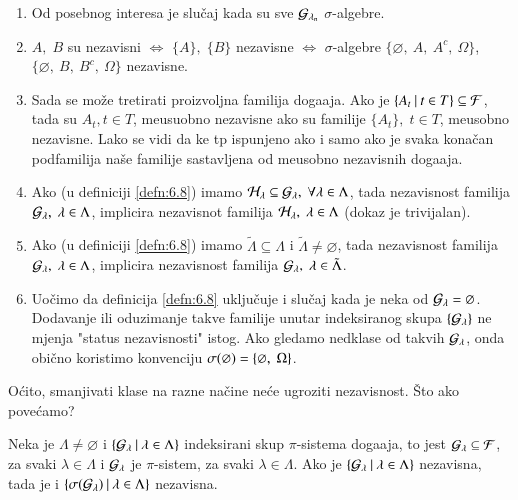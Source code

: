 \begin{nap} \label{nap:6.9}
    \begin{enumerate}[label=(\alph*)]
        \item Od posebnog interesa je slu\v caj kada su sve $\mathcal{G}_{\lambda_n}$ $\sigma$-algebre.
        \item $A, \; B$ su nezavisni $\iff$ $\{A\}, \; \{B\}$ nezavisne $\iff$ $\sigma$-algebre $\{ \varnothing, \: A, \: A^c, \: \Omega \}$, $\{ \varnothing, \: B, \: B^c, \: \Omega \}$ nezavisne.
        \item   \label{nap:6.9c}
        Sada se mo\v ze tretirati proizvoljna familija doga\dj aja.
        Ako je $\{{A_t} \: | \: {t \in T}\} \subseteq \mathcal{F}$, tada su $A_t, t \in T$, me\dj usuobno nezavisne ako su familije $\{A_t\}, \; t \in T$, me\dj usobno nezavisne.
        Lako se vidi da ke tp ispunjeno ako i samo ako je svaka kona\v can podfamilija na\v se familije sastavljena od me\dj usobno nezavisnih doga\dj aja.
        \item \label{nap:6.9d}
        Ako (u definiciji \ref{defn:6.8}) imamo $\mathcal{H}_\lambda \subseteq \mathcal{G}_\lambda, \; \forall \lambda \in \Lambda$, tada nezavisnost familija $\mathcal{G}_\lambda, \; \lambda \in \Lambda$, implicira nezavisnot familija $\mathcal{H}_\lambda, \; \lambda \in \Lambda$ (dokaz je trivijalan).
        \item Ako (u definiciji \ref{defn:6.8}) imamo $\tilde{\Lambda} \subseteq \Lambda$ i $\tilde{\Lambda} \neq \varnothing$, tada nezavisnost familija $\mathcal{G}_\lambda, \; \lambda \in \Lambda$, implicira nezavisnost familija $\mathcal{G}_\lambda, \; \lambda \in \tilde{\Lambda}$.
        \item \label{nap:6.9f}
        Uo\v cimo da definicija \ref{defn:6.8} uklju\v cuje i slu\v caj kada je neka od $\mathcal{G}_\lambda = \varnothing$.
        Dodavanje ili oduzimanje takve familije unutar indeksiranog skupa $\{\mathcal{G}_\lambda\}$ ne mjenja "status nezavisnosti" istog.
        Ako gledamo nedklase od takvih $\mathcal{G}_\lambda$, onda obi\v cno koristimo konvenciju $\sigma({\varnothing}) = \{ \varnothing, \; \Omega\}$.
    \end{enumerate}
\end{nap}

O\' cito, smanjivati klase na razne na\v cine ne\' ce ugroziti nezavisnost.
\v Sto ako pove\' camo?

\begin{tm}  \label{tm:6.10}
    Neka je $\Lambda \neq \varnothing$ i $\{{\mathcal{G}_\lambda} \: | \: {\lambda \in \Lambda}\}$ indeksirani skup $\pi$-sistema doga\dj aja, to jest $\mathcal{G}_\lambda \subseteq \mathcal{F}$, za svaki $\lambda \in \Lambda$ i $\mathcal{G}_\lambda$ je $\pi$-sistem, za svaki $\lambda \in \Lambda$.
    Ako je $\{{\mathcal{G}_\lambda} \: | \: {\lambda \in \Lambda}\}$ nezavisna, tada je i $\{{\sigma({\mathcal{G}_\lambda})} \: | \: {\lambda \in \Lambda}\}$ nezavisna.
\end{tm}

